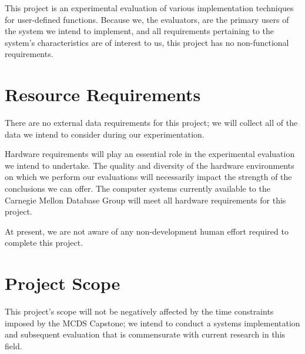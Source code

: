 \documentclass{vldb}
\begin{document}
This project is an experimental evaluation of various implementation techniques for user-defined functions. Because we, the evaluators, are the primary users of the system we intend to implement, and all requirements pertaining to the system's characteristics are of interest to us, this project has no non-functional requirements. 


\section{Resource Requirements}

There are no external data requirements for this project; we will collect all of the data we intend to consider during our experimentation.

Hardware requirements will play an essential role in the experimental evaluation we intend to undertake. The quality and diversity of the hardware environments on which we perform our evaluations will necessarily impact the strength of the conclusions we can offer. The computer systems currently available to the Carnegie Mellon Database Group will meet all hardware requirements for this project.

At present, we are not aware of any non-development human effort required to complete this project.


\section{Project Scope}

This project's scope will not be negatively affected by the time constraints imposed by the MCDS Capstone; we intend to conduct a systems implementation and subsequent evaluation that is commensurate with current research in this field.


\newcommand{\newblock}{}

\newpage
\balance


\end{document}
